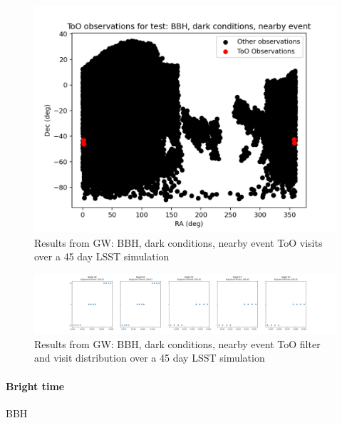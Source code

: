 \begin{figure}[h!]
    \centering
    \includegraphics[width=0.85\linewidth]{figures/validationTests/SVRequired/BBHDarkNearPosition.png}
    \caption{Results from GW: BBH, dark conditions, nearby event ToO visits over a 45 day LSST simulation}
    \label{fig:GWDarkNearPositionResult}
\end{figure}

\begin{figure}[h!]
    \centering
    \includegraphics[width=\linewidth]{figures/validationTests/SVRequired/BBHDarkNearFilterPlot.png}
    \caption{Results from GW: BBH, dark conditions, nearby event ToO filter and visit distribution over a 45 day LSST simulation}
    \label{fig:GWDarkNearFilterResult}
\end{figure}
\clearpage
\paragraph{Bright time} BBH

